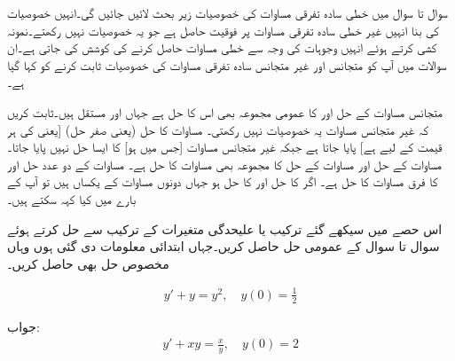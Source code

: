 سوال  تا سوال  میں خطی سادہ تفرقی مساوات کی خصوصیات زیر بحث لائیں جائیں گی۔انہیں خصوصیات کی بنا انہیں غیر خطی سادہ تفرقی مساوات پر فوقیت حاصل ہے جو یہ خصوصیات نہیں رکھتے۔نمونہ کشی کرتے ہوئے انہیں وجوہات کی وجہ سے خطی مساوات حاصل کرنے کی کوشش کی جاتی ہے۔ان سوالات میں آپ کو متجانس اور غیر متجانس سادہ تفرقی مساوات کی خصوصیات ثابت کرنے کو کہا گیا ہے۔



متجانس مساوات  کے حل  اور  کا عمومی مجموعہ  بھی اس کا حل ہے جہاں  اور  مستقل ہیں۔ثابت کریں کہ غیر متجانس مساوات  یہ خصوصیات نہیں رکھتی۔
مساوات  کا  حل (یعنی صفر حل)  [یعنی  کی ہر قیمت کے لیے  ہے]  پایا جاتا ہے جبکہ غیر متجانس مساوات  [جس میں  ہو] کا ایسا حل نہیں پایا جاتا۔
مساوات  کے حل  اور مساوات  کے حل  کا مجموعہ  بھی مساوات  کا حل ہے۔ 
مساوات  کے دو عدد حل  اور  کا فرق  مساوات  کا حل ہے۔ 
اگر  کا حل  اور  کا حل  ہو جہاں دونوں مساوات کے  یکساں ہیں تو آپ  کے بارے میں کیا کہہ سکتے ہیں۔

اس حصے میں سیکھے گئے ترکیب یا علیحدگی متغیرات کے ترکیب سے حل کرتے ہوئے سوال  تا سوال  کے عمومی حل حاصل کریں۔جہاں ابتدائی معلومات دی گئی ہوں وہاں مخصوص حل بھی حاصل کریں۔

\begin{align*}
y'+y=y^2,\quad y(0)=\frac{1}{2}
\end{align*}

جواب:
\begin{align*}
y'+xy=\frac{x}{y},\quad y(0)=2
\end{align*}

